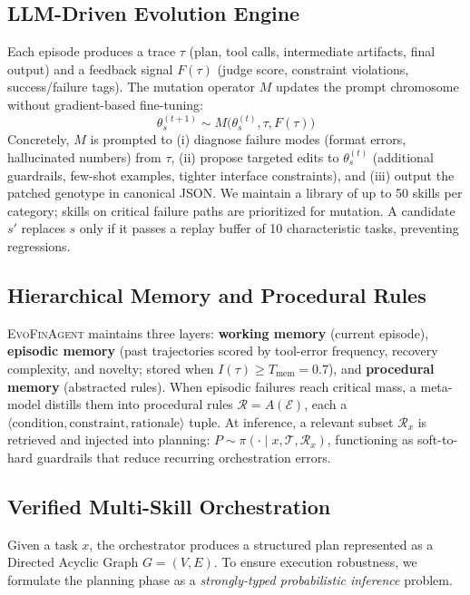 \documentclass{article}
\begin{document}
\subsection{LLM-Driven Evolution Engine}
Each episode produces a trace $\tau$ (plan, tool calls, intermediate artifacts, final output) and a feedback signal $F(\tau)$ (judge score, constraint violations, success/failure tags). The mutation operator $M$ updates the prompt chromosome without gradient-based fine-tuning:
\begin{equation}
\theta_s^{(t+1)} \sim M\big(\theta_s^{(t)}, \tau, F(\tau)\big)
\end{equation}
Concretely, $M$ is prompted to (i) diagnose failure modes (format errors, hallucinated numbers) from $\tau$, (ii) propose targeted edits to $\theta_s^{(t)}$ (additional guardrails, few-shot examples, tighter interface constraints), and (iii) output the patched genotype in canonical JSON. We maintain a library of up to 50 skills per category; skills on critical failure paths are prioritized for mutation. A candidate $s'$ replaces $s$ only if it passes a replay buffer of 10 characteristic tasks, preventing regressions.

\subsection{Hierarchical Memory and Procedural Rules}
\textsc{EvoFinAgent} maintains three layers: \textbf{working memory} (current episode), \textbf{episodic memory} (past trajectories scored by tool-error frequency, recovery complexity, and novelty; stored when $I(\tau) \ge T_{\text{mem}}=0.7$), and \textbf{procedural memory} (abstracted rules). When episodic failures reach critical mass, a meta-model distills them into procedural rules $\mathcal{R} = A(\mathcal{E})$, each a $\langle\text{condition}, \text{constraint}, \text{rationale}\rangle$ tuple. At inference, a relevant subset $\mathcal{R}_x$ is retrieved and injected into planning: $P \sim \pi(\cdot \mid x, \mathcal{T}, \mathcal{R}_x)$, functioning as soft-to-hard guardrails that reduce recurring orchestration errors.

\subsection{Verified Multi-Skill Orchestration}
Given a task $x$, the orchestrator produces a structured plan represented as a Directed Acyclic Graph $G = (V, E)$. To ensure execution robustness, we formulate the planning phase as a \emph{strongly-typed probabilistic inference} problem.
\end{document}
